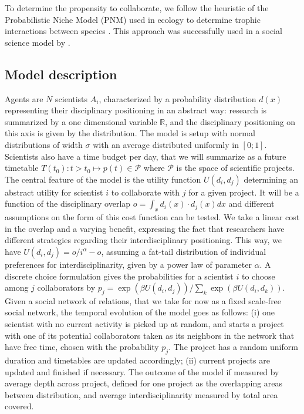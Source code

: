 \documentclass[utf8]{frontiersFPHY} %
\begin{document}
To determine the propensity to collaborate, we follow the heuristic of the Probabilistic Niche Model (PNM) used in ecology to determine trophic interactions between species \cite{williams2010probabilistic}. This approach was successfully used in a social science model by \cite{raimbault2020spatial}.


\subsection{Model description}

Agents are $N$ scientists $A_i$, characterized by a probability distribution $d(x)$ representing their disciplinary positioning in an abstract way: research is summarized by a one dimensional variable $\mathbb{R}$, and the disciplinary positioning on this axis is given by the distribution. The model is setup with normal distributions of width $\sigma$ with an average distributed uniformly in $\left[0;1\right]$. Scientists also have a time budget per day, that we will summarize as a future timetable $T(t_0):t>t_0 \mapsto p(t) \in \mathcal{P}$ where $\mathcal{P}$ is the space of scientific projects. The central feature of the model is the utility function $U(d_i,d_j)$ determining an abstract utility for scientist $i$ to collaborate with $j$ for a given project. It will be a function of the disciplinary overlap $o = \int_x d_i(x)\cdot d_j(x) dx$ and different assumptions on the form of this cost function can be tested. We take a linear cost in the overlap and a varying benefit, expressing the fact that researchers have different strategies regarding their interdisciplinary positioning. This way, we have $U(d_i,d_j) = o / i^\alpha - o$, assuming a fat-tail distribution of individual preferences for interdisciplinarity, given by a power law of parameter $\alpha$. A discrete choice formulation gives the probabilities for a scientist $i$ to choose among $j$ collaborators by $p_j = \exp\left(\beta U(d_i,d_j) \right)/\sum_k \exp\left(\beta U(d_i,d_k) \right)$. Given a social network of relations, that we take for now as a fixed scale-free social network, the temporal evolution of the model goes as follows: (i) one scientist with no current activity is picked up at random, and starts a project with one of its potential collaborators taken as its neighbors in the network that have free time, chosen with the probability $p_j$. The project has a random uniform duration and timetables are updated accordingly; (ii) current projects are updated and finished if necessary. The outcome of the model if measured by average depth across project, defined for one project as the overlapping areas between distribution, and average interdisciplinarity measured by total area covered.
\end{document}
